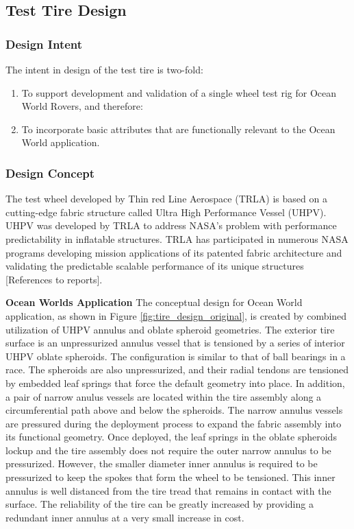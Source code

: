 \documentclass{article}
\begin{document}
\subsection{Test Tire Design}

\subsubsection{Design Intent}
The intent in design of the test tire is two-fold:
\begin{enumerate}
    \item To support development and validation of a single wheel test rig for Ocean World Rovers, and therefore:
    \item 	To incorporate basic attributes that are functionally relevant to the Ocean World application.
\end{enumerate}

\subsubsection{Design Concept}
The test wheel developed by Thin red Line Aerospace (TRLA) is based on a cutting-edge fabric structure called Ultra High Performance Vessel (UHPV). UHPV was developed by TRLA to address NASA’s problem with performance predictability in inflatable structures. TRLA has participated in numerous NASA programs developing mission applications of its patented fabric architecture and validating the predictable scalable performance of its unique structures [References to reports].

\textbf{Ocean Worlds Application}
\newline
The conceptual design for Ocean World application, as shown in Figure \ref{fig:tire_design_original}, is created by combined utilization of UHPV annulus and oblate spheroid geometries. The exterior tire surface is an unpressurized annulus vessel that is tensioned by a series of interior UHPV oblate spheroids. The configuration is similar to that of ball bearings in a race. The spheroids are also unpressurized, and their radial tendons are tensioned by embedded leaf springs that force the default geometry into place. In addition, a pair of narrow anulus vessels are located within the tire assembly along a circumferential path above and below the spheroids. The narrow annulus vessels are pressured during the deployment process to expand the fabric assembly into its functional geometry. Once deployed, the leaf springs in the oblate spheroids lockup and the tire assembly does not require the outer narrow annulus to be pressurized. However, the smaller diameter inner annulus is required to be pressurized to keep the spokes that form the wheel to be tensioned. This inner annulus is well distanced from the tire tread that remains in contact with the surface. The reliability of the tire can be greatly increased by providing a redundant inner annulus at a very small increase in cost.
\end{document}
